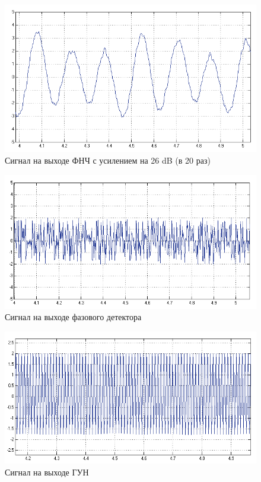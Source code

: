\begin{figure}[H]
\includegraphics[width=150mm, scale = 0.9]{lab8/PLL_gain}
   \caption{Сигнал на выходе ФНЧ с усилением на 26 dB (в 20 раз)}
\end{figure}


\begin{figure}[H]
\includegraphics[width=150mm, scale = 0.9]{lab8/PD}
   \caption{Сигнал на выходе фазового детектора}
\end{figure}

\begin{figure}[H]
\includegraphics[width=150mm, scale = 0.9]{lab8/VCO}
   \caption{Сигнал на выходе ГУН}
\end{figure}

